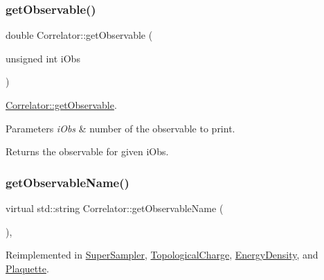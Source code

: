\mbox{\label{class_correlator_aada8184c033e0465f540a368465c9ba5}} 
\subsubsection{\texorpdfstring{getObservable()}{getObservable()}}
{\footnotesize\ttfamily double Correlator\+::get\+Observable (\begin{DoxyParamCaption}\item[{unsigned int}]{i\+Obs }\end{DoxyParamCaption})\hspace{0.3cm}{\ttfamily [virtual]}}



\mbox{\hyperlink{class_correlator_aada8184c033e0465f540a368465c9ba5}{Correlator\+::get\+Observable}}. 


\begin{DoxyParams}{Parameters}
{\em i\+Obs} & number of the observable to print. \\
\hline
\end{DoxyParams}
\begin{DoxyReturn}{Returns}
the observable for given i\+Obs. 
\end{DoxyReturn}
\mbox{\label{class_correlator_ad1fa59e864917c3e48da037f90c3488f}} 
\subsubsection{\texorpdfstring{getObservableName()}{getObservableName()}}
{\footnotesize\ttfamily virtual std\+::string Correlator\+::get\+Observable\+Name (\begin{DoxyParamCaption}{ }\end{DoxyParamCaption})\hspace{0.3cm}{\ttfamily [inline]}, {\ttfamily [virtual]}}



Reimplemented in \mbox{\hyperlink{class_super_sampler_a84d3ba9a56dd2a36cb11d495c32f5ca6}{Super\+Sampler}}, \mbox{\hyperlink{class_topological_charge_ad12d246692f3d9ea0ef591814010ef88}{Topological\+Charge}}, \mbox{\hyperlink{class_energy_density_a59b320595bca439333d36e3753ca07f0}{Energy\+Density}}, and \mbox{\hyperlink{class_plaquette_a86de9d267ae1bc6a8c6d3335837ea683}{Plaquette}}.

